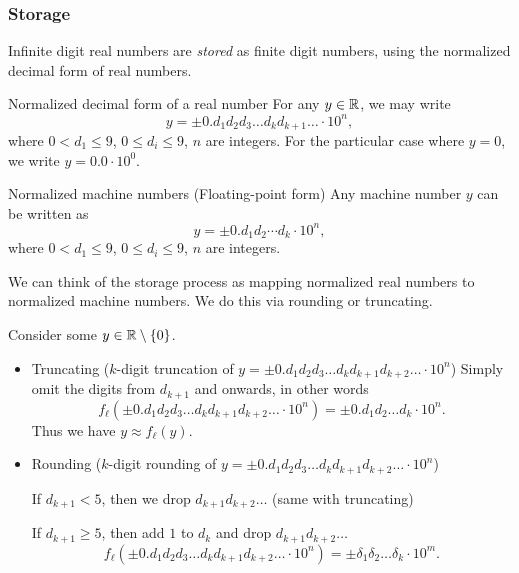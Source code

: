\documentclass[class=article, crop=false]{standalone}
\begin{document}
  \subsubsection{Storage}
  Infinite digit real numbers are \emph{stored} as finite digit numbers, using the normalized decimal form of real numbers.
  \begin{definition}{Normalized decimal form of a real number}
    For any $y\in\mathbb{R}$, we may write
    \[
      y = \pm 0.d_1d_2d_3\dotsc d_kd_{k + 1}\dotsc\cdot 10^n,
    \]
    where $0 < d_1\leq 9$, $0\leq d_i\leq 9$, $n$ are integers. For the particular case where $y = 0$, we write $y = 0.0\cdot 10^0$.
  \end{definition}
  \begin{definition}{Normalized machine numbers (Floating-point form)}
    Any machine number $y$ can be written as
    \[
      y = \pm 0.d_1d_2\dotsb d_k\cdot 10^n,
    \]
    where $0 < d_1\leq 9$, $0\leq d_i\leq 9$, $n$ are integers.
  \end{definition}
  We can think of the storage process as mapping normalized real numbers to normalized machine numbers. We do this via rounding or truncating. \par
  Consider some $y\in\mathbb{R}\setminus \left\{0\right\}$.
  \begin{itemize}
    \item Truncating ($k$-digit truncation of $y = \pm 0.d_1d_2d_3\dotsc d_kd_{k + 1}d_{k + 2}\dotsc\cdot 10^n$)
    Simply omit the digits from $d_{k + 1}$ and onwards, in other words
    \[
      f_\ell(\pm 0.d_1d_2d_3\dotsc d_kd_{k + 1}d_{k + 2}\dotsc\cdot 10^n) = \pm 0.d_1d_2\dotsc d_k\cdot 10^n.
    \]
    Thus we have $y\approx f_\ell(y)$.
    \item Rounding ($k$-digit rounding of $y = \pm 0.d_1d_2d_3\dotsc d_kd_{k + 1}d_{k + 2}\dotsc\cdot 10^n$) \par
    If $d_{k + 1} < 5$, then we drop $d_{k + 1}d_{k + 2}\dotsc$ (same with truncating) \par
    If $d_{k + 1} \geq 5$, then add $1$ to $d_k$ and drop $d_{k + 1}d_{k + 2}\dotsc$
    \[
      f_\ell(\pm 0.d_1d_2d_3\dotsc d_kd_{k + 1}d_{k + 2}\dotsc\cdot 10^n) = \pm \delta_1\delta_2\dotsc \delta_k\cdot 10^m.
    \]
  \end{itemize}
\end{document}
